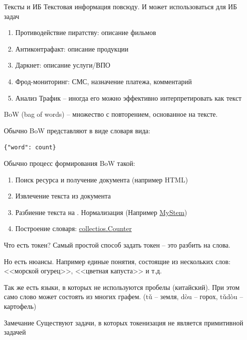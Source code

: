 \begin{frame}{Тексты и ИБ}
	Текстовая информация повсюду. 
	И может использоваться для ИБ задач
	\begin{enumerate}
		\item Противодействие пиратству: описание фильмов
		\item Антиконтрафакт: описание продукции
		\item Даркнет: описание услуги/ВПО
		\item Фрод-мониторинг: СМС, назначение платежа, комментарий
		\item Анализ Трафик -- иногда его можно эффективно интерпретировать как текст
	\end{enumerate}
\end{frame}

\begin{frame}[fragile]{BoW}
	 (bag of words) -- множество с повторением, 
	основанное на тексте.
	
	Обычно BoW представляют в виде словаря вида:
	\begin{center}
		\texttt{\{"word": count\}}
	\end{center}
		
	Обычно процесс формирования BoW такой:
	\begin{enumerate}
		\item Поиск ресурса и получение документа (например HTML)

		\item Извлечение текста из документа
		\item Разбиение текста на . 
		Нормализация (Например \href{https://yandex.ru/dev/mystem/}{MyStem})
		\item Построение словаря: \href{https://docs.python.org/3/library/collections.html\#collections.Counter}{collectios.Counter}
	\end{enumerate}
\end{frame}

\begin{frame}{Что есть токен?}
	Самый простой способ задать токен -- это разбить на слова. 
	
	Но есть нюансы. Например единые понятия, состоящие из нескольких слов:
	<<морской огурец>>, <<цветная капуста>> и т.д.
	
	Так же есть языки, в которых не используются пробелы (китайский). 
	При этом само слово может состоять из многих графем. 
	(tǔ -- земля, dòu -- горох, tǔdòu -- картофель)
	
	\begin{block}{Замечание}
		Существуют задачи, в которых токенизация не является примитивной задачей
	\end{block}
\end{frame}

